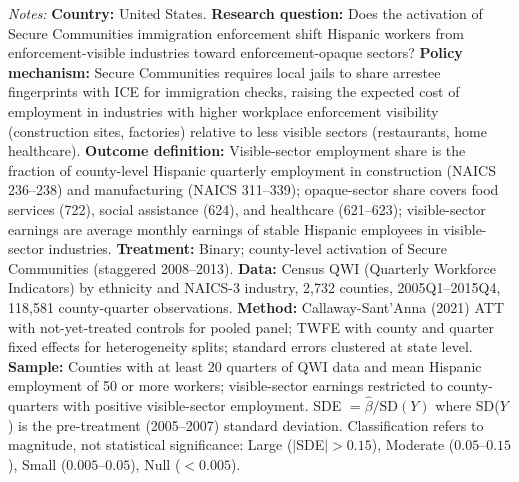 \begin{table}[htbp]
\begin{threeparttable}
\begin{tablenotes}[flushleft]
\item \textit{Notes:} \textbf{Country:} United States. \textbf{Research question:} Does the activation of Secure Communities immigration enforcement shift Hispanic workers from enforcement-visible industries toward enforcement-opaque sectors? \textbf{Policy mechanism:} Secure Communities requires local jails to share arrestee fingerprints with ICE for immigration checks, raising the expected cost of employment in industries with higher workplace enforcement visibility (construction sites, factories) relative to less visible sectors (restaurants, home healthcare). \textbf{Outcome definition:} Visible-sector employment share is the fraction of county-level Hispanic quarterly employment in construction (NAICS 236--238) and manufacturing (NAICS 311--339); opaque-sector share covers food services (722), social assistance (624), and healthcare (621--623); visible-sector earnings are average monthly earnings of stable Hispanic employees in visible-sector industries. \textbf{Treatment:} Binary; county-level activation of Secure Communities (staggered 2008--2013). \textbf{Data:} Census QWI (Quarterly Workforce Indicators) by ethnicity and NAICS-3 industry, 2,732 counties, 2005Q1--2015Q4, 118,581 county-quarter observations. \textbf{Method:} Callaway-Sant'Anna (2021) ATT with not-yet-treated controls for pooled panel; TWFE with county and quarter fixed effects for heterogeneity splits; standard errors clustered at state level. \textbf{Sample:} Counties with at least 20 quarters of QWI data and mean Hispanic employment of 50 or more workers; visible-sector earnings restricted to county-quarters with positive visible-sector employment. SDE $= \hat{\beta} / \text{SD}(Y)$ where SD($Y$) is the pre-treatment (2005--2007) standard deviation. Classification refers to magnitude, not statistical significance: Large ($|$SDE$| > 0.15$), Moderate ($0.05$--$0.15$), Small ($0.005$--$0.05$), Null ($< 0.005$).
\end{tablenotes}
\end{threeparttable}
\end{table}
